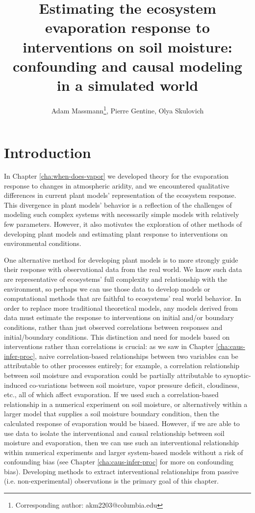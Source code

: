 \documentclass[12pt]{article}
\begin{document}
\title{Estimating the ecosystem evaporation response to interventions
  on soil moisture: confounding and causal modeling in a simulated
  world}

\author{Adam Massmann\thanks{Corresponding author:
    akm2203@columbia.edu}, Pierre Gentine, Olya Skulovich}

\maketitle

\section{Introduction}

In Chapter \ref{cha:when-does-vapor} we developed theory for the
evaporation response to changes in atmospheric aridity, and we
encountered qualitative differences in current plant models'
representation of the ecosystem response. This divergence in plant
models' behavior is a reflection of the challenges of modeling such
complex systems with necessarily simple models with relatively few
parameters. However, it also motivates the exploration of other
methods of developing plant models and estimating plant response to
interventions on environmental conditions.

One alternative method for developing plant models is to more strongly
guide their response with observational data from the real world. We
know such data are representative of ecosystems' full complexity and
relationship with the environment, so perhaps we can use those data to
develop models or computational methods that are faithful to
ecosystems' real world behavior. In order to replace more traditional
theoretical models, any models derived from data must estimate the
response to interventions on initial and/or boundary conditions,
rather than just observed correlations between responses and
initial/boundary conditions. This distinction and need for models
based on interventions rather than correlations is crucial: as we saw
in Chapter \ref{cha:caus-infer-proc}, naive correlation-based
relationships between two variables can be attributable to other
processes entirely; for example, a correlation relationship between
soil moisture and evaporation could be partially attributable to
synoptic-induced co-variations between soil moisture, vapor pressure
deficit, cloudiness, etc., all of which affect evaporation. If we used
such a correlation-based relationship in a numerical experiment on
soil moisture, or alternatively within a larger model that supplies a
soil moisture boundary condition, then the calculated response of
evaporation would be biased. However, if we are able to use data to
isolate the interventional and causal relationship between soil
moisture and evaporation, then we can use such an interventional
relationship within numerical experiments and larger system-based
models without a risk of confounding bias (see Chapter
\ref{cha:caus-infer-proc} for more on confounding bias). Developing
methods to extract interventional relationships from passive
(i.e. non-experimental) observations is the primary goal of this
chapter.
\end{document}
